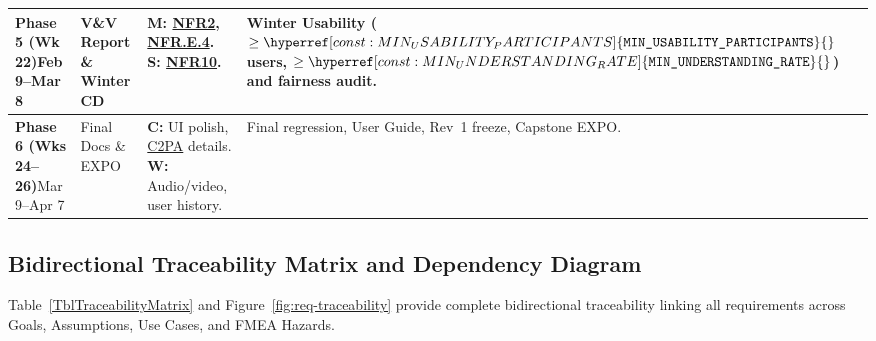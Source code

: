 \documentclass[11pt]{article}
\newcommand{\MinUnderstandingRate}{\hyperref[const:MIN_UNDERSTANDING_RATE]{\texttt{MIN\_\allowbreak{}UNDERSTANDING\_\allowbreak{}RATE}}}
\newcommand{\MinUsabilityParticipants}{\hyperref[const:MIN_USABILITY_PARTICIPANTS]{\texttt{MIN\_\allowbreak{}USABILITY\_\allowbreak{}PARTICIPANTS}}}
\newcommand{\CTwoPA}{\hyperlink{acr-c2pa}{C2PA}}
\begin{document}
{\begin{tabularx}{\textwidth}{P{2.5cm} P{2.9cm} P{3.6cm} Y}
\midrule
\textbf{Phase 5 (Wk 22)}\newline Feb 9--Mar 8 & V\&V Report \& Winter CD & \textbf{M:} \hyperref[NFR2]{NFR2}, \hyperref[NFR.E.4]{NFR.E.4}. \textbf{S:} \hyperref[NFR10]{NFR10}. & Winter Usability ($\ge \MinUsabilityParticipants{}$ users, $\ge \MinUnderstandingRate{}$) and fairness audit.\\
\midrule
\textbf{Phase 6 (Wks 24--26)}\newline Mar 9--Apr 7 & Final Docs \& EXPO & \textbf{C:} UI polish, \CTwoPA{} details. \textbf{W:} Audio/video, user history. & Final regression, User Guide, Rev~1 freeze, Capstone EXPO.\\
\end{tabularx}
}

\subsection{Bidirectional Traceability Matrix and Dependency Diagram}\label{subsec:traceability}

Table~\ref{TblTraceabilityMatrix} and Figure~\ref{fig:req-traceability} provide complete bidirectional traceability linking all requirements across Goals, Assumptions, Use Cases, and FMEA Hazards.
\end{document}
